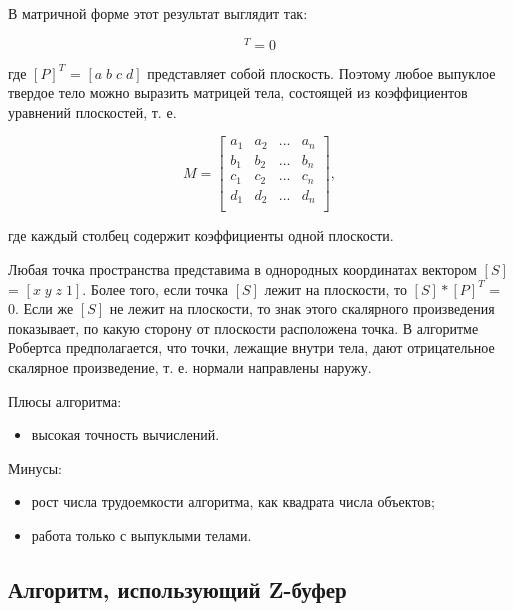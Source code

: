 В матричной форме этот результат выглядит так:

\begin{equation}
	[x \: y \: z \: 1][P]^T = 0
\end{equation}

где $[P]^T$ = $[a \; b \; c \; d]$ представляет собой плоскость. Поэтому любое выпуклое твердое тело можно выразить матрицей тела, состоящей из коэффициентов уравнений плоскостей, т. е.

\begin{equation}
	M = \begin{bmatrix}
		a_1 & a_2 & ... & a_n           \\[0.3em]
		b_1 & b_2 & ... & b_n           \\[0.3em]
		c_1 & c_2 & ... & c_n           \\[0.3em]
		d_1 & d_2 & ... & d_n           \\[0.3em]
	\end{bmatrix},
\end{equation}

где каждый столбец содержит коэффициенты одной плоскости.

Любая точка пространства представима в однородных координатах вектором $[S]$ = $[x \; y \; z \; 1]$. Более того, если точка $[S]$ лежит на плоскости, то $[S]*[P]^T$ = 0. Если же $[S]$ не лежит на плоскости, то знак этого скалярного произведения показывает, по какую сторону от плоскости расположена точка. В алгоритме Робертса предполагается, что точки, лежащие внутри тела, дают отрицательное скалярное произведение, т. е. нормали направлены наружу. 

Плюсы алгоритма:

\begin{itemize}
	\item высокая точность вычислений.
\end{itemize}

Минусы:

\begin{itemize}
	\item рост числа трудоемкости алгоритма, как квадрата числа объектов;
	\item работа только с выпуклыми телами.
\end{itemize}

\subsection{Алгоритм, использующий Z-буфер}

